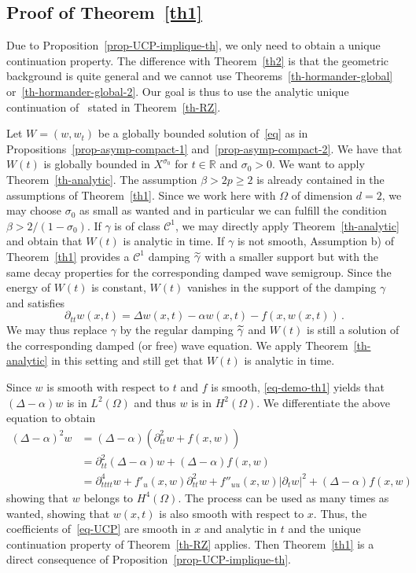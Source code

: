 \documentclass[AHL,Unicode,longabstracts]{cedram}
\newcommand{\RR}{\mathbb{R}}
\newcommand{\Cc}{\mathcal{C}}
\let\oldtilde\tilde
\renewcommand*{\tilde}[1]{\mathchoice{\widetilde{#1}}{\widetilde{#1}}{\oldtilde{#1}}{\oldtilde{#1}}}\let\oldexists\exists
\renewcommand*{\exists}{\mathrel{\oldexists}}
\begin{document}
\subsection{Proof of Theorem~\ref{th1}}
Due to Proposition~\ref{prop-UCP-implique-th}, we only need to obtain a unique continuation property. The difference with Theorem~\ref{th2} is that the geometric background is quite general and we cannot use Theorems~\ref{th-hormander-global} or~\ref{th-hormander-global-2}. Our goal is thus to use the analytic unique continuation of~\cite{Rob-Zui} stated in Theorem~\ref{th-RZ}.

Let $W=(w,w_t)$ be a globally bounded solution of~\eqref{eq} as in Propositions~\ref{prop-asymp-compact-1} and~\ref{prop-asymp-compact-2}. We have that $W(t)$ is globally bounded in $X^{\sigma_0}$ for $t\in\RR$ and $\sigma_0>0$. We want to apply Theorem~\ref{th-analytic}. The assumption $\beta>2p\geq 2$ is already contained in the assumptions of Theorem~\ref{th1}. Since we work here with $\Omega$ of dimension $d=2$, we may choose $\sigma_0$ as small as wanted and in particular we can fulfill the condition $\beta>2/(1-\sigma_0)$. If $\gamma$ is of class $\Cc^1$, we may directly apply Theorem~\ref{th-analytic} and obtain that $W(t)$ is analytic in time. If $\gamma$ is not smooth, Assumption b) of Theorem~\ref{th1} provides a $\Cc^1$ damping $\tilde\gamma$ with a smaller support but with the same decay properties for the corresponding damped wave semigroup. Since the energy of $W(t)$ is constant, $W(t)$ vanishes in the support of the damping $\gamma$ and satisfies
\begin{equation}\label{eq-demo-th1}
\partial_{tt}w(x,t)=\Delta w(x,t) - \alpha w(x,t) - f(x,w(x,t))\,.
\end{equation}
We may thus replace $\gamma$ by the regular damping $\tilde\gamma$ and $W(t)$ is still a solution of the corresponding damped (or free) wave equation. We apply Theorem~\ref{th-analytic} in this setting and still get that $W(t)$ is analytic in time.


Since $w$ is smooth with respect to $t$ and $f$ is smooth, \eqref{eq-demo-th1} yields that $(\Delta - \alpha) w$ is in $L^2(\Omega)$ and thus $w$ is in $H^2(\Omega)$. We differentiate the above equation to obtain
\begin{align*}
(\Delta-\alpha)^2 w&=(\Delta-\alpha)\left(\partial^2_{tt} w + f(x,w)\right)\\
&=\partial^2_{tt}(\Delta-\alpha) w + (\Delta-\alpha) f(x,w)\\
&= \partial_{tttt}^4 w + f'_u(x,w)\partial^2_{tt}w + f''_{uu}(x,w)|\partial_t w|^2 + (\Delta-\alpha) f(x,w)
\end{align*}
showing that $w$ belongs to $H^4(\Omega)$. The process can be used as many times as wanted, showing that $w(x,t)$ is also smooth with respect to $x$. Thus, the coefficients of~\eqref{eq-UCP} are smooth in $x$ and analytic in $t$ and the unique continuation property of Theorem~\ref{th-RZ} applies. Then Theorem~\ref{th1} is a direct consequence of Proposition~\ref{prop-UCP-implique-th}.
\end{document}
